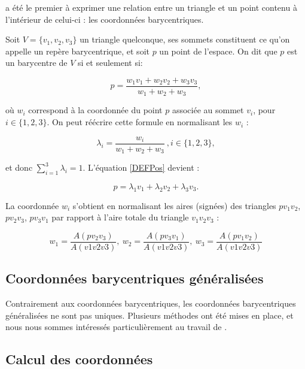 \cite{Mob27} a été le premier à exprimer une relation entre un triangle et un
point contenu à l'intérieur de celui-ci : les coordonnées barycentriques.

Soit $V = \{v_1, v_2, v_3\}$ un triangle quelconque, ses sommets constituent ce
qu'on appelle un repère barycentrique, et soit $p$ un point de l'espace. On dit
que $p$ est un barycentre de $V$ si et seulement si:

\begin{equation}
  p = \frac{w_1 v_1 + w_2 v_2 + w_3 v_3}{w_1+w_2+w_3},
  \label{DEFPos}
\end{equation}

où $w_i$ correspond à la coordonnée du point $p$ associée au sommet $v_i$,
pour $i \in \{1, 2, 3\}$. On peut réécrire cette formule en normalisant les
$w_i$ :

\begin{equation}
  \lambda_i = \frac{w_i}{w_1+w_2+w_3} ~, i \in \{1, 2, 3\}, 
\end{equation}

et donc $\sum_{i=1}^3 \lambda_i = 1$. L'équation \ref{DEFPos} devient :

\begin{equation}
  p = \lambda_1 v_1 + \lambda_2 v_2 + \lambda_3 v_3.
\end{equation}

La coordonnée $w_i$ s'obtient en normalisant les aires (signées) des triangles
$pv_1v_2$, $pv_2v_3$, $pv_3v_1$ par rapport à l'aire totale du triangle
$v_1v_2v_3$ :

\begin{equation}
  w_1 = \frac{A(pv_2v_3)}{A(v1v2v3)},~  w_2 = \frac{A(pv_3v_1)}{A(v1v2v3)},~  w_3 = \frac{A(pv_1v_2)}{A(v1v2v3)}
\end{equation}

\subsection{Coordonnées barycentriques généralisées}

Contrairement aux coordonnées barycentriques, les coordonnées barycentriques
généralisées ne sont pas uniques. Plusieurs méthodes ont été mises en place,
et nous nous sommes intéressés particulièrement au travail de \cite{Flo03}.

\subsection{Calcul des coordonnées}


